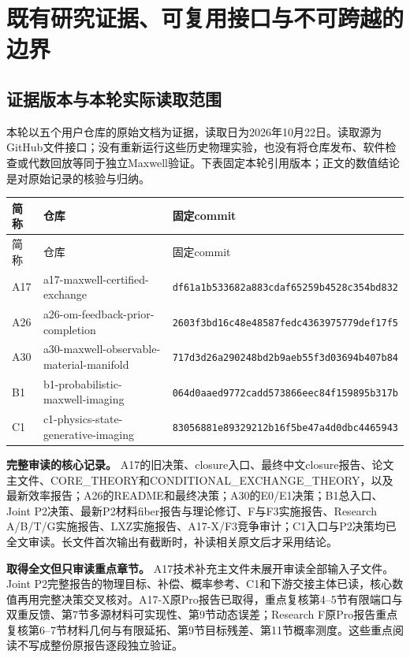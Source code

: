 \section{既有研究证据、可复用接口与不可跨越的边界}
\label{sec:prior-evidence}

\subsection{证据版本与本轮实际读取范围}

本轮以五个用户仓库的原始文档为证据，读取日为2026年10月22日。读取源为GitHub文件接口；没有重新运行这些历史物理实验，也没有将仓库发布、软件检查或代数回放等同于独立Maxwell验证。下表固定本轮引用版本；正文的数值结论是对原始记录的核验与归纳。\cite{R_A17,R_A26,R_A30,R_B1,R_C1}

\begin{longtable}{p{1.2cm}p{5.3cm}p{6.85cm}}
\hline
简称 & 仓库 & 固定commit\\
\hline
\endfirsthead
\hline 简称 & 仓库 & 固定commit\\\hline
\endhead
A17 & a17-maxwell-certified-exchange & {\scriptsize\texttt{df61a1b533682a883cdaf65259b4528c354bd832}}\\
A26 & a26-om-feedback-prior-completion & {\scriptsize\texttt{2603f3bd16c48e48587fedc4363975779def17f5}}\\
A30 & a30-maxwell-observable-material-manifold & {\scriptsize\texttt{717d3d26a290248bd2b9aeb55f3d03694b407b84}}\\
B1 & b1-probabilistic-maxwell-imaging & {\scriptsize\texttt{064d0aaed9772cadd573866eec84f159895b317b}}\\
C1 & c1-physics-state-generative-imaging & {\scriptsize\texttt{83056881e89329212b16f5be47a4d0dbc4465943}}\\
\hline
\end{longtable}

\textbf{完整审读的核心记录。}
A17的旧决策、closure入口、最终中文closure报告、论文主文件、CORE\_THEORY和CONDITIONAL\_EXCHANGE\_THEORY，以及最新效率报告；A26的README和最终决策；A30的E0/E1决策；B1总入口、Joint P2决策、最新P2材料fiber报告与理论修订、F与F3实施报告、Research A/B/T/G实施报告、LXZ实施报告、A17-X/F3竞争审计；C1入口与P2决策均已全文审读。长文件首次输出有截断时，补读相关原文后才采用结论。

\textbf{取得全文但只审读重点章节。}
A17技术补充主文件未展开审读全部输入子文件。Joint P2完整报告的物理目标、补偿、概率参考、C1和下游交接主体已读，核心数值再用完整决策交叉核对。A17-X原Pro报告已取得，重点复核第4--5节有限端口与双重反馈、第7节多源材料可实现性、第9节动态误差；Research F原Pro报告重点复核第6--7节材料几何与有限延拓、第9节目标残差、第11节概率测度。这些重点阅读不写成整份原报告逐段独立验证。\cite{R_A17X,R_F}

